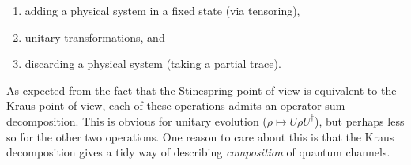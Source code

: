 \documentclass[fleqn]{article}
\providecommand{\tightlist}{%
  \setlength{\itemsep}{0pt}\setlength{\parskip}{0pt}}
\begin{document}
\begin{enumerate}
\def\labelenumi{\arabic{enumi}.}
\tightlist
\item
  adding a physical system in a fixed state (via tensoring),
\item
  unitary transformations, and
\item
  discarding a physical system (taking a partial trace).
\end{enumerate}

As expected from the fact that the Stinespring point of view is equivalent to the Kraus point of view, each of these operations admits an operator-sum decomposition.
This is obvious for unitary evolution (\(\rho\mapsto U\rho U^\dagger\)), but perhaps less so for the other two operations.
One reason to care about this is that the Kraus decomposition gives a tidy way of describing \emph{composition} of quantum channels.
\end{document}
